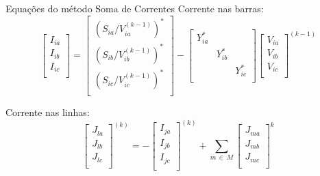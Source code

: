 \documentclass[10pt]{beamer}
\begin{document}
\begin{frame}{Equações do método Soma de Correntes}
   Corrente nas barras:
    \begin{equation}
    \label{equ:shirmI}
      \left[ \begin{matrix}
      I_{ia} \\
      I_{ib} \\
      I_{ic} \\
      \end{matrix} \right]  = 
      \left[ \begin{matrix}
      \left(S_{ia} \big / V_{ia}^{(k-1)} \right)^* \\
      \left(S_{ib} \big / V_{ib}^{(k-1)} \right)^* \\
      \left(S_{ic} \big / V_{ic}^{(k-1)} \right)^* \\
      \end{matrix} \right] -
      \left[ \begin{matrix}
      Y_{ia}^* & & \\
      & Y_{ib}^* & \\
      & & Y_{ic}^* \\
      \end{matrix} \right]
      \left[ \begin{matrix}
      V_{ia} \\
      V_{ib} \\
      V_{ic} \\
      \end{matrix} \right]^{(k-1)}
    \end{equation}
 
    Corrente nas linhas:
    \begin{equation}
    \label{equ:shirmJ}
     \left[ \begin{matrix}
     J_{la} \\
     J_{lb} \\
     J_{lc} \\
     \end{matrix} \right]^{(k)}  = -
      \left[ \begin{matrix}
      I_{ja} \\
      I_{jb} \\
      I_{jc} \\
      \end{matrix} \right]^{(k)} + \sum_{m \, \in \, M}
       \left[ \begin{matrix}
       J_{ma} \\
       J_{mb} \\
       J_{mc} \\
       \end{matrix} \right]^{k}
    \end{equation}
    

\end{frame}
\end{document}
